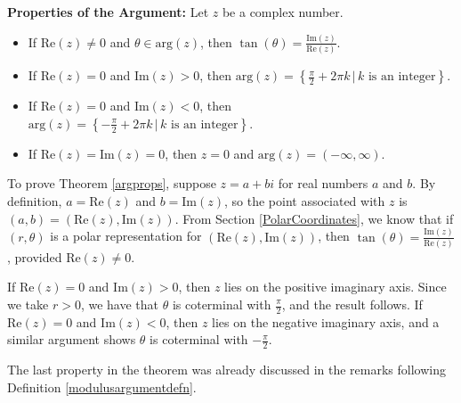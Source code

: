 \documentclass{ximera}
\begin{document}
\begin{theorem} \label{argprops} \textbf{Properties of the Argument:}  Let $z$ be a complex number.  
 
\begin{itemize}

\item  If $\text{Re}(z) \neq 0$ and $\theta \in \text{arg}(z)$, then $\tan(\theta) = \frac{\text{Im}(z)}{\text{Re}(z)}$.

\item  If $\text{Re}(z) = 0$ and  $\text{Im}(z) > 0$, then $\text{arg}(z) = \left\{ \frac{\pi}{2} + 2\pi k \, | \, \text{$k$ is an integer} \right\}$.

\item  If $\text{Re}(z) = 0$ and $\text{Im}(z) < 0$, then $\text{arg}(z) = \left\{ -\frac{\pi}{2} + 2\pi k \, | \, \text{$k$ is an integer} \right\}$.

\item  If $\text{Re}(z) = \text{Im}(z) = 0$, then $z = 0$ and $\text{arg}(z) = (-\infty, \infty)$.

\end{itemize}

 

\end{theorem}

 

To prove Theorem \ref{argprops}, suppose $z = a + bi$ for real numbers $a$ and $b$.  By definition, $a = \text{Re}(z)$ and $b = \text{Im}(z)$, so the point associated with $z$ is $(a,b) = \left(\text{Re}(z), \text{Im}(z)\right)$.  From Section \ref{PolarCoordinates}, we know that if $(r,\theta)$ is a polar representation for $\left(\text{Re}(z), \text{Im}(z)\right)$, then $\tan(\theta) = \frac{\text{Im}(z)}{\text{Re}(z)}$, provided $\text{Re}(z) \neq 0$. 

 

 If $\text{Re}(z) = 0$ and $\text{Im}(z) > 0$, then $z$ lies on the positive imaginary axis.  Since we take $r > 0$,  we have that $\theta$ is coterminal with $\frac{\pi}{2}$, and the result follows.   If $\text{Re}(z) = 0$ and $\text{Im}(z) < 0$, then $z$ lies on the negative imaginary axis, and a similar argument shows $\theta$ is coterminal with $-\frac{\pi}{2}$.  
  
   
  
  The last property in the theorem was already discussed in the remarks following Definition \ref{modulusargumentdefn}.  
\end{document}
